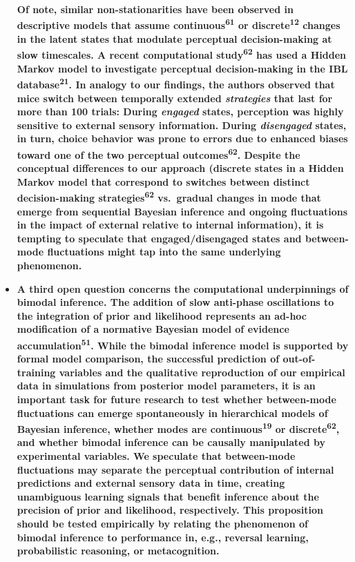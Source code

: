 \documentclass[
]{article}
\begin{document}
\begin{itemize}
  \textbf{Of note, similar non-stationarities have been observed in
  descriptive models that assume continuous\textsuperscript{61} or
  discrete\textsuperscript{12} changes in the latent states that
  modulate perceptual decision-making at slow timescales. A recent
  computational study\textsuperscript{62} has used a Hidden Markov model
  to investigate perceptual decision-making in the IBL
  database\textsuperscript{21}. In analogy to our findings, the authors
  observed that mice switch between temporally extended
  \emph{strategies} that last for more than 100 trials: During
  \emph{engaged} states, perception was highly sensitive to external
  sensory information. During \emph{disengaged} states, in turn, choice
  behavior was prone to errors due to enhanced biases toward one of the
  two perceptual outcomes\textsuperscript{62}. Despite the conceptual
  differences to our approach (discrete states in a Hidden Markov model
  that correspond to switches between distinct decision-making
  strategies\textsuperscript{62} vs.~gradual changes in mode that emerge
  from sequential Bayesian inference and ongoing fluctuations in the
  impact of external relative to internal information), it is tempting
  to speculate that engaged/disengaged states and between-mode
  fluctuations might tap into the same underlying phenomenon.}
\item
  \textbf{A third open question concerns the computational underpinnings
  of bimodal inference. The addition of slow anti-phase oscillations to
  the integration of prior and likelihood represents an ad-hoc
  modification of a normative Bayesian model of evidence
  accumulation\textsuperscript{51}. While the bimodal inference model is
  supported by formal model comparison, the successful prediction of
  out-of-training variables and the qualitative reproduction of our
  empirical data in simulations from posterior model parameters, it is
  an important task for future research to test whether between-mode
  fluctuations can emerge spontaneously in hierarchical models of
  Bayesian inference, whether modes are continuous\textsuperscript{19}
  or discrete\textsuperscript{62}, and whether bimodal inference can be
  causally manipulated by experimental variables. We speculate that
  between-mode fluctuations may separate the perceptual contribution of
  internal predictions and external sensory data in time, creating
  unambiguous learning signals that benefit inference about the
  precision of prior and likelihood, respectively. This proposition
  should be tested empirically by relating the phenomenon of bimodal
  inference to performance in, e.g., reversal learning, probabilistic
  reasoning, or metacognition.}
\end{itemize}
\end{document}
